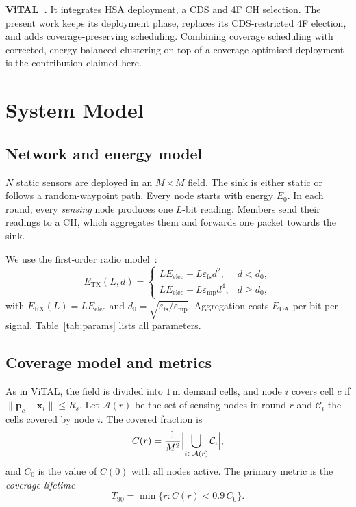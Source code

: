 \documentclass[journal]{IEEEtran}
\newcommand{\TN}{T_{90}}
\begin{document}
\textbf{ViTAL~\cite{ali2025vital}.} It integrates HSA deployment, a CDS and 4F CH selection. The present work keeps its deployment phase, replaces its CDS-restricted 4F election, and adds coverage-preserving scheduling. Combining coverage scheduling with corrected, energy-balanced clustering on top of a coverage-optimised deployment is the contribution claimed here.

\section{System Model}\label{sec:model}
\subsection{Network and energy model}
$N$ static sensors are deployed in an $M\times M$ field. The sink is either static or follows a random-waypoint path. Every node starts with energy $E_0$. In each round, every \emph{sensing} node produces one $L$-bit reading. Members send their readings to a CH, which aggregates them and forwards one packet towards the sink.

We use the first-order radio model~\cite{heinzelman2002leachc}:
\begin{equation}
E_{\mathrm{TX}}(L,d)=\begin{cases}L E_{\mathrm{elec}}+L\varepsilon_{\mathrm{fs}}d^{2}, & d<d_0,\\ L E_{\mathrm{elec}}+L\varepsilon_{\mathrm{mp}}d^{4}, & d\ge d_0,\end{cases}
\end{equation}
with $E_{\mathrm{RX}}(L)=L E_{\mathrm{elec}}$ and $d_0=\sqrt{\varepsilon_{\mathrm{fs}}/\varepsilon_{\mathrm{mp}}}$. Aggregation costs $E_{\mathrm{DA}}$ per bit per signal. Table~\ref{tab:params} lists all parameters.

\subsection{Coverage model and metrics}
As in ViTAL, the field is divided into $1\,$m demand cells, and node $i$ covers cell $c$ if $\lVert \mathbf{p}_c-\mathbf{x}_i\rVert\le R_s$. Let $\mathcal{A}(r)$ be the set of sensing nodes in round $r$ and $\mathcal{C}_i$ the cells covered by node $i$. The covered fraction is
\begin{equation}
C(r)=\frac{1}{M^2}\Bigl|\bigcup_{i\in\mathcal{A}(r)}\mathcal{C}_i\Bigr|,
\end{equation}
and $C_0$ is the value of $C(0)$ with all nodes active.
The primary metric is the \emph{coverage lifetime}
\begin{equation}
\TN=\min\{r: C(r)<0.9\,C_0\}.
\end{equation}
\end{document}
